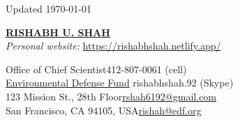 \documentclass{article}
\begin{document}
\begin{flushright}
Updated \today
\end{flushright}
\begin{center}
\href{https://www.linkedin.com/pub/rishabh-shah/46/962/361}{\Large \textbf{RISHABH U. SHAH}}\\\textit{Personal website: }\href{https://rishabhshah.netlify.app/}{https://rishabhshah.netlify.app/}
\end{center}
\vspace{-2.5mm}
Office of Chief Scientist\hfill 412-807-0061 (cell)\\\href{https://www.edf.org/}{Environmental Defense Fund}
\hfill rishabhshah.92 (Skype)\\123 Mission St., 28th Floor\hfill \href{mailto:rshah6192@gmail.com}{rshah6192@gmail.com}\\San Francisco, CA 94105, USA\hfill \href{mailto:rishah@edf.org}{rishah@edf.org}
\newline
\vspace{5mm}
\end{document}
